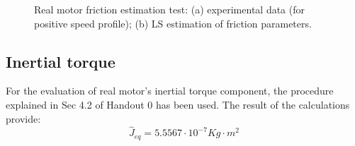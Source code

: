 \documentclass[11pt]{article}
\begin{document}
		\begin{figure}[h!]
		\centering
		\quad
		\caption{Real motor friction estimation test: (a) experimental data (for positive speed profile); (b) LS estimation of friction parameters.}
		\end{figure}

	\subsection{Inertial torque}
	For the evaluation of real motor's inertial torque component, the procedure explained in Sec 4.2 of Handout 0 has been used. The result of the calculations provide:
	\begin{equation}
		\hat J_{eq} = 5.5567\cdot10^{-7}Kg\cdot m^2
	\end{equation}
\end{document}
